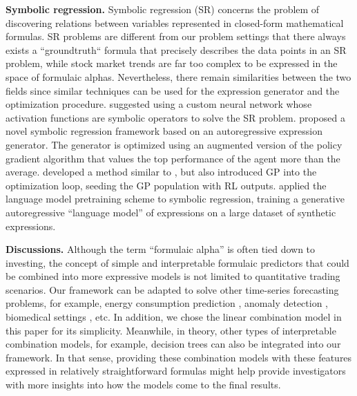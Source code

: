 \textbf{Symbolic regression.} Symbolic regression (SR) concerns the problem of discovering relations between variables represented in closed-form mathematical formulas. SR problems are different from our problem settings that there always exists a ``groundtruth`` formula that precisely describes the data points in an SR problem, while stock market trends are far too complex to be expressed in the space of formulaic alphas. Nevertheless, there remain similarities between the two fields since similar techniques can be used for the expression generator and the optimization procedure. \cite{srnn} suggested using a custom neural network whose activation functions are symbolic operators to solve the SR problem. \cite{dsr} proposed a novel symbolic regression framework based on an autoregressive expression generator. The generator is optimized using an augmented version of the policy gradient algorithm that values the top performance of the agent more than the average. \cite{dsrgp} developed a method similar to \cite{dsr}, but also introduced GP into the optimization loop, seeding the GP population with RL outputs. \cite{symbolicgpt} applied the language model pretraining scheme to symbolic regression, training a generative autoregressive ``language model'' of expressions on a large dataset of synthetic expressions.

\textbf{Discussions.} Although the term ``formulaic alpha'' is often tied down to investing, the concept of simple and interpretable formulaic predictors that could be combined into more expressive models is not limited to quantitative trading scenarios. Our framework can be adapted to solve other time-series forecasting problems, for example, energy consumption prediction \cite{disc1}, anomaly detection \cite{disc2}, biomedical settings \cite{disc3}, etc. In addition, we chose the linear combination model in this paper for its simplicity. Meanwhile, in theory, other types of interpretable combination models, for example, decision trees can also be integrated into our framework. In that sense, providing these combination models with these features expressed in relatively straightforward formulas might help provide investigators with more insights into how the models come to the final results.
